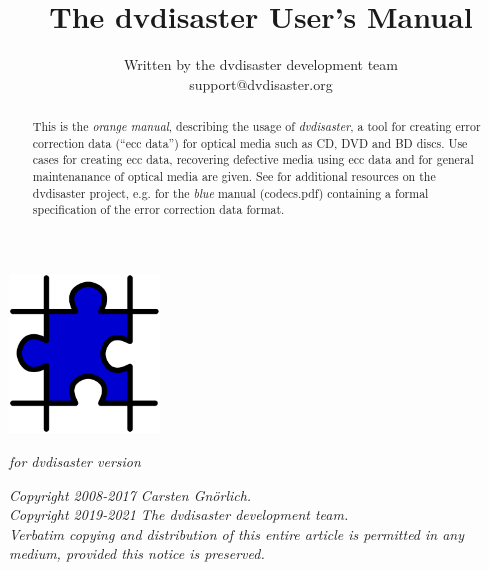 \documentclass[12pt,a4paper,twoside]{article}
\newcommand{\paperversion}{{\em for dvdisaster version \projectversion}}
\begin{document}
\pagecolor{lightorange}
\title{The dvdisaster User's Manual}
\author{Written by the dvdisaster development team\\support@dvdisaster.org}
\date{}
\maketitle
\thispagestyle{empty}

\centerline{\includegraphics[width=40mm]{figures/puzzle.pdf}}

\begin{center}
\paperversion
\end{center}

\bigskip

\begin{abstract}
This is the {\em orange manual}, describing the usage of {\em dvdisaster}, a tool for
creating error correction data (``ecc data'') 
for optical media  such as CD, DVD and BD discs. 
Use cases for creating ecc data, recovering defective media
using ecc data and for general maintenanance of optical 
media are given. 
See \homepage for additional resources on
the dvdisaster project, e.g. for the {\em blue} manual (codecs.pdf)
containing a formal specification of the error correction data format.
\end{abstract}

\vfill
\begin{center}
{\em 
  Copyright 2008-2017 Carsten Gnörlich.\\
  Copyright 2019-2021 The dvdisaster development team.\\
  Verbatim copying and distribution of this entire article is permitted in
  any medium, provided this notice is preserved.}
\end{center}

\newpage
\nopagecolor


\tableofcontents
\newpage


\newpage


\newpage


\newpage


\newpage


\newpage


\newpage



\label{LastPage}\label{missing}
\end{document}
